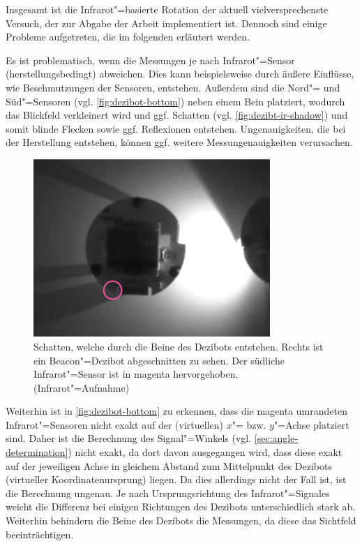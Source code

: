 {Insgesamt ist die Infrarot"=basierte Rotation der aktuell vielversprechenste Versuch, der zur Abgabe der Arbeit implementiert ist.
Dennoch sind einige Probleme aufgetreten, die im folgenden erläutert werden.


Es ist problematisch, wenn die Messungen je nach Infrarot"=Sensor (herstellungsbedingt) abweichen. Dies kann beispielsweise durch äußere Einflüsse, wie Beschmutzungen der Sensoren, entstehen. Außerdem sind die Nord"= und Süd"=Sensoren (vgl. \autoref{fig:dezibot-bottom}) neben einem Bein platziert, wodurch das Blickfeld verkleinert wird und ggf. Schatten (vgl. \autoref{fig:dezibt-ir-shadow}) und somit blinde Flecken sowie ggf. Reflexionen entstehen. Ungenauigkeiten, die bei der Herstellung entstehen, können ggf. weitere Messungenauigkeiten verursachen.

\begin{figure}[h]
    \centering
    \includegraphics[width=0.8\textwidth]{../assets/dezibot_ir_shadow.png}
    \caption{Schatten, welche durch die Beine des Dezibots entstehen. Rechts ist ein Beacon"=Dezibot abgeschnitten zu sehen. Der südliche Infrarot"=Sensor ist in magenta hervorgehoben. (Infrarot"=Aufnahme)}
    \label{fig:dezibt-ir-shadow}
\end{figure}


Weiterhin ist in \autoref{fig:dezibot-bottom} zu erkennen, dass die magenta umrandeten Infrarot"=Sensoren nicht exakt auf der (virtuellen) $x$"= bzw. $y$"=Achse platziert sind. Daher ist die Berechnung des Signal"=Winkels (vgl. \autoref{sec:angle-determination}) nicht exakt, da dort davon ausgegangen wird, dass diese exakt auf der jeweiligen Achse in gleichem Abstand zum Mittelpunkt des Dezibots (virtueller Koordinatenursprung) liegen. Da dies allerdings nicht der Fall ist, ist die Berechnung ungenau. Je nach Ursprungsrichtung des Infrarot"=Signales weicht die Differenz bei einigen Richtungen des Dezibots unterschiedlich stark ab. Weiterhin behindern die Beine des Dezibots die Messungen, da diese das Sichtfeld beeinträchtigen.

}

